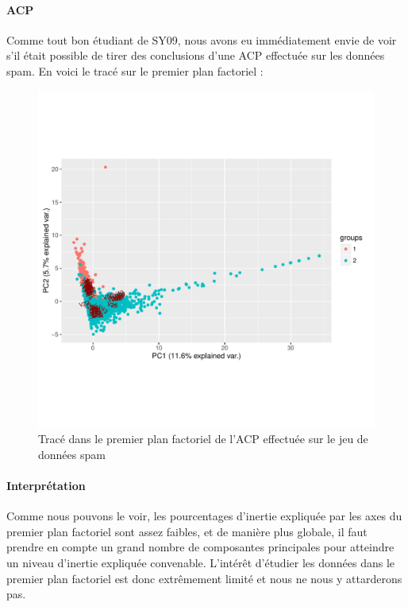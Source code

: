 \documentclass{report}
\begin{document}
\paragraph{ACP}
Comme tout bon étudiant de SY09, nous avons eu immédiatement envie de voir s'il était possible de tirer des conclusions d'une ACP effectuée sur les données spam. En voici le tracé sur le premier plan factoriel :

\begin{figure}[ht!]
\begin{center}
    \includegraphics[width=\textwidth]{pca_spam.pdf}
    \caption{Tracé dans le premier plan factoriel de l'ACP effectuée sur le jeu de données spam}
\end{center}
\end{figure}

\paragraph{Interprétation}
Comme nous pouvons le voir, les pourcentages d'inertie expliquée par les axes du premier plan factoriel sont assez faibles, et de manière plus globale, il faut prendre en compte un grand nombre de composantes principales pour atteindre un niveau d'inertie expliquée convenable. L'intérêt d'étudier les données dans le premier plan factoriel est donc extrêmement limité et nous ne nous y attarderons pas.
\end{document}
